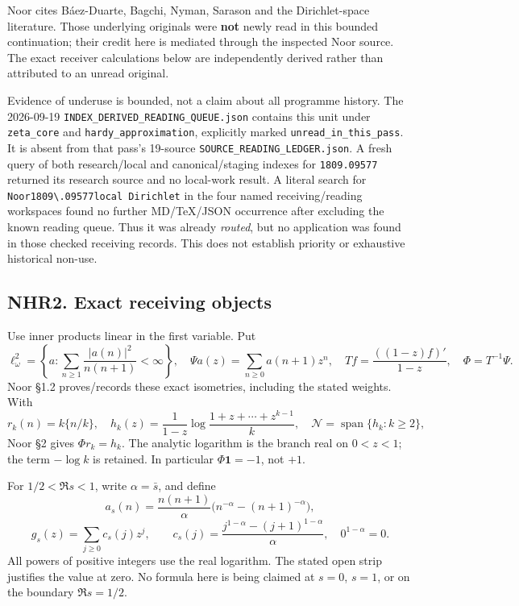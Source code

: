 Noor cites Báez-Duarte, Bagchi, Nyman, Sarason and the Dirichlet-space
literature. Those underlying originals were \textbf{not} newly read in
this bounded continuation; their credit here is mediated through the
inspected Noor source. The exact receiver calculations below are
independently derived rather than attributed to an unread original.

Evidence of underuse is bounded, not a claim about all programme
history. The 2026-09-19 \nolinkurl{INDEX_DERIVED_READING_QUEUE.json}
contains this unit under \texttt{zeta\_core} and
\texttt{hardy\_approximation}, explicitly marked
\texttt{unread\_in\_this\_pass}. It is absent from that pass's 19-source
\texttt{SOURCE\_READING\_LEDGER.json}. A fresh query of both
research/local and canonical/staging indexes for \texttt{1809.09577}
returned its research source and no local-work result. A literal search
for
\texttt{Noor\textbar{}1809\textbackslash{}.09577\textbar{}local\ Dirichlet}
in the four named receiving/reading workspaces found no further
MD/TeX/JSON occurrence after excluding the known reading queue. Thus it
was already \emph{routed}, but no application was found in those checked
receiving records. This does not establish priority or exhaustive
historical non-use.

\subsection{NHR2. Exact receiving
objects}\label{nhr2.-exact-receiving-objects}

Use inner products linear in the first variable. Put \[
 \ell^2_\omega=\left\{a:\sum_{n\ge1}\frac{|a(n)|^2}{n(n+1)}<\infty\right\},
 \quad \Psi a(z)=\sum_{n\ge0}a(n+1)z^n,
 \quad Tf=\frac{((1-z)f)'}{1-z},\quad \Phi=T^{-1}\Psi.
\] Noor §1.2 proves/records these exact isometries, including the stated
weights. With \[
 r_k(n)=k\{n/k\},\quad
 h_k(z)=\frac1{1-z}\log\frac{1+z+\cdots+z^{k-1}}k,
 \quad\mathcal N=\operatorname{span}\{h_k:k\ge2\},
\] Noor §2 gives \(\Phi r_k=h_k\). The analytic logarithm is the branch
real on \(0<z<1\); the term \(-\log k\) is retained. In particular
\(\Phi\boldsymbol1=-1\), not \(+1\).

For \(1/2<\Re s<1\), write \(\alpha=\bar s\), and define \[
 a_s(n)=\frac{n(n+1)}\alpha\bigl(n^{-\alpha}-(n+1)^{-\alpha}\bigr),
\] \[
 g_s(z)=\sum_{j\ge0}c_s(j)z^j,\qquad
 c_s(j)=\frac{j^{1-\alpha}-(j+1)^{1-\alpha}}\alpha,
 \quad0^{1-\alpha}=0.
 \tag{NHR2.1}
\] All powers of positive integers use the real logarithm. The stated
open strip justifies the value at zero. No formula here is being claimed
at \(s=0\), \(s=1\), or on the boundary \(\Re s=1/2\).

